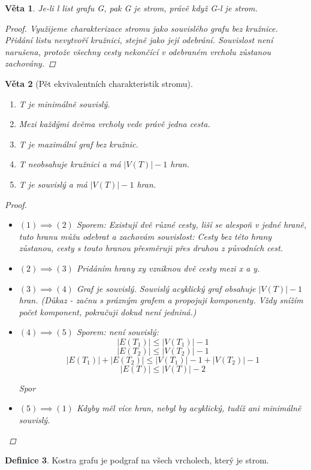 \documentclass[10pt,a4paper]{article}
\theoremstyle{plain}
\newtheorem{veta}{Věta}
\theoremstyle{definition}
\newtheorem{definice}[veta]{Definice}
\begin{document}
\begin{veta}Je-li l list grafu G, pak G je strom, právě když G-l je strom.
\begin{proof}
Využijeme charakterizace stromu jako souvislého grafu bez kružnice. Přidání listu nevytvoří kružnici, stejně jako její odebrání. Souvislost není narušena, protože všechny cesty nekončící v odebraném vrcholu zůstanou zachovány.
\end{proof}
\end{veta}

\begin{veta}[Pět ekvivalentních charakteristik stromu]
\begin{enumerate}
\item T je minimálně souvislý.
\item Mezi každými dvěma vrcholy vede právě jedna cesta.
\item T je maximální graf bez kružnic.
\item T neobsahuje kružnici a má $|V(T)| - 1$ hran.
\item T je souvislý a má $|V(T)| - 1$ hran.
\end{enumerate}
\begin{proof}
\begin{itemize}
\item $(1) \implies (2)$
Sporem: Existují dvě různé cesty, liší se alespoň v jedné hraně, tuto hranu můžu odebrat a zachovám souvislost: Cesty bez této hrany zůstanou, cesty s touto hranou přesměruji přes druhou z původních cest.
\item $(2) \implies (3)$
Pridáním hrany xy vzniknou dvě cesty mezi x a y.
\item $(3) \implies (4)$
Graf je souvislý.
Souvislý acyklický graf obsahuje $|V(T)| - 1$ hran. (Důkaz - začnu s prázným grafem a propojuji komponenty. Vždy snížím počet komponent, pokračuji dokud není jedniná.)
\item $(4) \implies (5)$
Sporem: není souvislý: \[|E(T_1)| \leq |V(T_1)| -1\]
\[|E(T_2)| \leq |V(T_2)| -1\]
\[|E(T_1)| + |E(T_2)| \leq |V(T_1)| - 1 +  |V(T_2)| -1 \]
\[|E(T)| \leq |V(T)| - 2\]

Spor
\item $(5) \implies (1)$
Kdyby měl více hran, nebyl by acyklický, tudíž ani minimálně souvislý.
\end{itemize}
\end{proof}

\end{veta}

\begin{definice}
Kostra grafu je 	podgraf na všech vrcholech, který je strom.
\end{definice}
\end{document}
